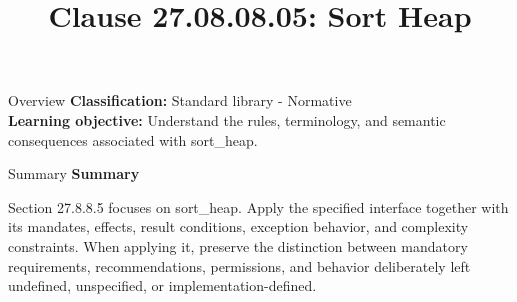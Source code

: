 \documentclass[10pt,letterpaper]{article}
\title{Clause 27.08.08.05: Sort Heap}
\author{}
\date{}
\begin{document}
\maketitle
\begin{CornellOverviewBox}{Overview}
\textbf{Classification:} Standard library - Normative\\[2pt]
\textbf{Learning objective:} Understand the rules, terminology, and semantic consequences associated with sort\_heap.
\end{CornellOverviewBox}\begin{CornellSummaryBox}{Summary}
{\sffamily\bfseries\color{Accent} Summary}\par\vspace{3pt}Section 27.8.8.5 focuses on sort\_heap. Apply the specified interface together with its mandates, effects, result conditions, exception behavior, and complexity constraints. When applying it, preserve the distinction between mandatory requirements, recommendations, permissions, and behavior deliberately left undefined, unspecified, or implementation-defined.
\end{CornellSummaryBox}
\end{document}
